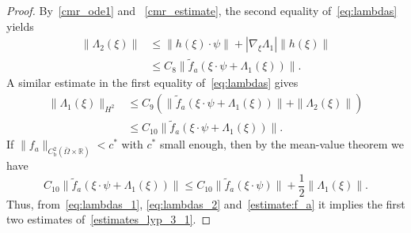 \documentclass[10pt,a4paper]{amsart}
\begin{document}
\begin{proof}
By~\eqref{cmr_ode1} and ~\eqref{cmr_estimate}, the second equality of~\eqref{eq:lambdas} yields
\begin{equation} \label{eq:lambdas_2}
\begin{split}
\|\Lambda_2(\xi)\|&\leqslant \|h(\xi)\cdot \psi \| + |\nabla_{\xi}\Lambda_1|\|h(\xi)\|\\
&\leqslant C_8\|\tilde{f}_a(\xi\cdot\psi + \Lambda_1(\xi))\|.
\end{split}
\end{equation}
A similar estimate in the first equality of~\eqref{eq:lambdas} gives
\begin{equation} \label{eq:lambdas_1}
\begin{split}
\|\Lambda_1(\xi)\|_{H^2} &\leqslant C_9\left(\|\tilde{f}_a(\xi\cdot\psi + \Lambda_1(\xi))\| + \|\Lambda_2(\xi)\|\right)\\
	&\leqslant C_{10}\|\tilde{f}_a(\xi\cdot\psi + \Lambda_1(\xi))\|.
\end{split}
\end{equation}
If $\|f_a\|_{C^2_{\mathrm{b}}(\bar{\Omega}\times\mathbb{R})}< c^{\ast}$ with $c^\ast$ small enough, then by the mean-value theorem we have
\begin{equation} \label{estimate:f_a}
C_{10}\|\tilde{f}_a(\xi\cdot\psi + \Lambda_1(\xi))\|\leqslant C_{10}\|\tilde{f}_a(\xi\cdot\psi)\| +\frac{1}{2}\|\Lambda_1(\xi)\|.
\end{equation}
Thus, from~\eqref{eq:lambdas_1}, \eqref{eq:lambdas_2} and~\eqref{estimate:f_a} it implies the first two estimates of~\eqref{estimates_lyp_3_1}.


\end{proof}
\end{document}
